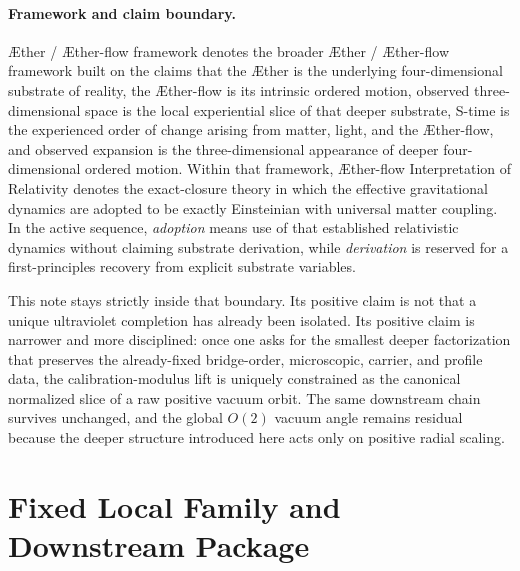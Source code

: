 \documentclass[11pt]{article}
\newcommand{\Aether}{\AE{}ther}
\newcommand{\Aflow}{\AE{}ther-flow}
\newcommand{\TheoryName}{\Aflow{} Interpretation of Relativity}
\newcommand{\TheoryProgram}{\Aether{} / \Aflow{} framework}
\begin{document}
\paragraph{Framework and claim boundary.}
\TheoryProgram{} denotes the broader \Aether{} / \Aflow{} framework built on the claims that the \Aether{} is the underlying four-dimensional substrate of reality, the \Aflow{} is its intrinsic ordered motion, observed three-dimensional space is the local experiential slice of that deeper substrate, S-time is the experienced order of change arising from matter, light, and the \Aflow{}, and observed expansion is the three-dimensional appearance of deeper four-dimensional ordered motion. Within that framework, \TheoryName{} denotes the exact-closure theory in which the effective gravitational dynamics are adopted to be exactly Einsteinian with universal matter coupling. In the active sequence, \emph{adoption} means use of that established relativistic dynamics without claiming substrate derivation, while \emph{derivation} is reserved for a first-principles recovery from explicit substrate variables.

This note stays strictly inside that boundary. Its positive claim is not that a unique ultraviolet completion has already been isolated. Its positive claim is narrower and more disciplined: once one asks for the smallest deeper factorization that preserves the already-fixed bridge-order, microscopic, carrier, and profile data, the calibration-modulus lift is uniquely constrained as the canonical normalized slice of a raw positive vacuum orbit. The same downstream chain survives unchanged, and the global \(O(2)\) vacuum angle remains residual because the deeper structure introduced here acts only on positive radial scaling.

\section{Fixed Local Family and Downstream Package}
\end{document}
